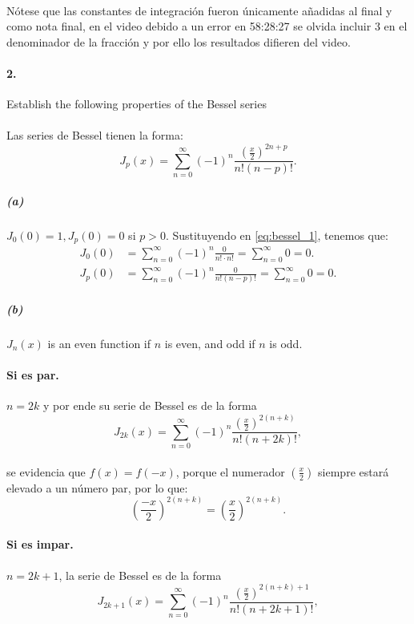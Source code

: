 \documentclass{article}
\begin{document}
\paragraph{}Nótese que las constantes de integración fueron únicamente añadidas al final y como nota final, en el video debido a un error en 58:28:27 se olvida incluir $3$ en el denominador de la fracción y por ello los resultados difieren del video.
\paragraph{2.} Establish the following properties of the Bessel series
\paragraph{} Las series de Bessel tienen la forma:
\begin{equation}
J_p(x) = \sum_{n=0}^{\infty} (-1)^n \frac{(\frac{x}{2})^{2n+p}}{n! (n-p)!}.\label{eq:bessel_1}
\end{equation}
\subparagraph{(a)} $J_0(0) = 1,J_p(0)=0$ si $p > 0$. Sustituyendo en \eqref{eq:bessel_1}, tenemos que:
\begin{align*}
	J_0(0) &= \sum_{n=0}^{\infty} (-1)^n \frac{0}{n! \cdot n!} = \sum_{n=0}^{\infty} 0 = 0.\\[5pt]
	J_p(0) &= \sum_{n=0}^{\infty} (-1)^n \frac{0}{n! (n-p)!} = \sum_{n=0}^{\infty} 0 = 0.
\end{align*}
\subparagraph{(b)} $J_n(x)$ is an even function if $n$ is even, and odd if $n$ is odd.
\paragraph{Si es par.} $n=2k$ y por ende su serie de Bessel es de la forma
\begin{equation}
J_{2k} (x) = \sum_{n=0}^{\infty} (-1)^n \frac{(\frac{x}{2})^{2(n+k)}}{n! (n + 2k)!}\label{eq:bessel_even},
\end{equation}
\paragraph{} se evidencia que $f(x) = f(-x)$, porque el numerador $(\frac{x}{2})$ siempre estará elevado a un número par, por lo que:
$$\left(\frac{-x}{2}\right)^{2(n+k)} = \left(\frac{x}{2}\right)^{2(n+k)}.$$
\paragraph{Si es impar.} $n=2k+1$, la serie de Bessel es de la forma
\begin{equation}
J_{2k+1} (x) = \sum_{n=0}^{\infty} (-1)^n \frac{(\frac{x}{2})^{2(n+k) + 1}}{n! (n+2k+1)!}\label{eq:bessel_odd},
\end{equation}
\end{document}
